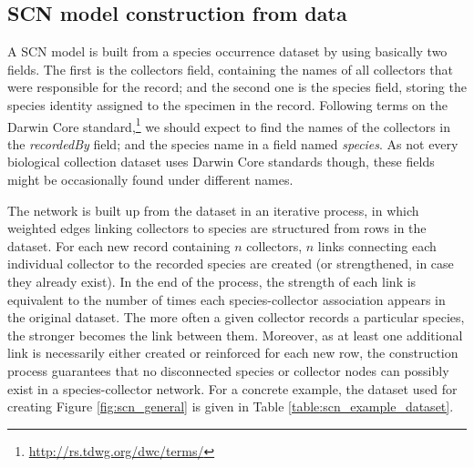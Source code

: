 {%
\subsection{SCN model construction from data}
\label{subsec:scn-model-construction}
A SCN model is built from a species occurrence dataset by using basically two fields.
The first is the collectors field, containing the names of all collectors that were responsible for the record; and the second one is the species field, storing the species identity assigned to the specimen in the record.
Following terms on the Darwin Core standard,\footnote{\url{http://rs.tdwg.org/dwc/terms/}} we should expect to find the names of the collectors in the \textit{recordedBy} field; and the species name in a field named \textit{species}. As not every biological collection dataset uses Darwin Core standards though, these fields might be occasionally found under different names.

The network is built up from the dataset in an iterative process, in which weighted edges linking collectors to species are structured from rows in the dataset.
For each new record containing $n$ collectors, $n$ links connecting each individual collector to the recorded species are created (or strengthened, in case they already exist).
In the end of the process, the strength of each link is equivalent to the number of times each species-collector association appears in the original dataset.
The more often a given collector records a particular species, the stronger becomes the link between them.
Moreover, as at least one additional link is necessarily either created or reinforced for each new row, the construction process guarantees that no disconnected species or collector nodes can possibly exist in a species-collector network.
For a concrete example, the dataset used for creating Figure \ref{fig:scn_general} is given in Table \ref{table:scn_example_dataset}.

}
